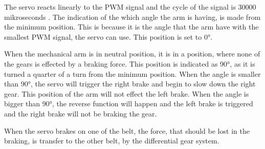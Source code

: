 The servo reacts linearly to the PWM signal and the cycle of the signal is 30000 mikroseconds . The indication of the which angle the arm is having, is made from the minimum position. This is because it is the angle that the arm have with the smallest PWM signal, the servo can use. This position is set to 0°.
 
 When the mechanical arm is in neutral position, it is in a position, where none of the gears is effected by a braking force. This position is indicated as 90°, as it is turned a quarter of a turn from the minimum position. When the angle is smaller than 90°, the servo will trigger the right brake and begin to slow down the right gear. This position of the arm will not effect the left brake. When the angle is bigger than 90°, the reverse function will happen and the left brake is triggered and the right brake will not be braking the gear.

When the servo brakes on one of the belt, the force, that should be lost in the braking, is transfer to the other belt, by the differential gear system.